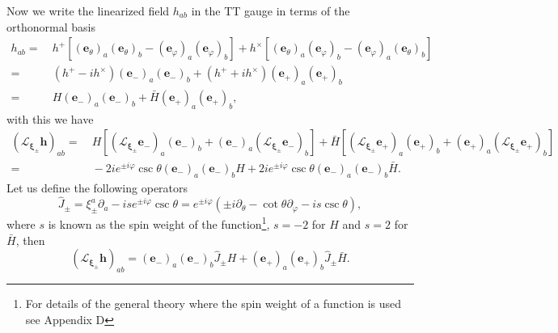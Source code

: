 Now we write the linearized field $h_{ab}$ in the TT gauge in terms
of the orthonormal basis
\begin{align*}
h_{ab}= & \ h^{+}\left[\left(\boldsymbol{e}_{\theta}\right)_{a}\left(\boldsymbol{e}_{\theta}\right)_{b}-\left(\boldsymbol{e}_{\varphi}\right)_{a}\left(\boldsymbol{e}_{\varphi}\right)_{b}\right]+h^{\times}\left[\left(\boldsymbol{e}_{\theta}\right)_{a}\left(\boldsymbol{e}_{\varphi}\right)_{b}-\left(\boldsymbol{e}_{\varphi}\right)_{a}\left(\boldsymbol{e}_{\theta}\right)_{b}\right]\\
= & \ \left(h^{+}-ih^{\times}\right)\left(\boldsymbol{e}_{-}\right)_{a}\left(\boldsymbol{e}_{-}\right)_{b}+\left(h^{+}+ih^{\times}\right)\left(\boldsymbol{e}_{+}\right)_{a}\left(\boldsymbol{e}_{+}\right)_{b}\\
= & \ H\left(\boldsymbol{e}_{-}\right)_{a}\left(\boldsymbol{e}_{-}\right)_{b}+\bar{H}\left(\boldsymbol{e}_{+}\right)_{a}\left(\boldsymbol{e}_{+}\right)_{b},
\end{align*}
with this we have
\begin{align*}
\left(\mathcal{L}_{\boldsymbol{\xi}_{\pm}}\boldsymbol{h}\right)_{ab}= & \ H\left[\left(\mathcal{L}_{\boldsymbol{\xi}_{\pm}}\boldsymbol{e}_{-}\right)_{a}\left(\boldsymbol{e}_{-}\right)_{b}+\left(\boldsymbol{e}_{-}\right)_{a}\left(\mathcal{L}_{\boldsymbol{\xi}_{\pm}}\boldsymbol{e}_{-}\right)_{b}\right]+\bar{H}\left[\left(\mathcal{L}_{\boldsymbol{\xi}_{\pm}}\boldsymbol{e}_{+}\right)_{a}\left(\boldsymbol{e}_{+}\right)_{b}+\left(\boldsymbol{e}_{+}\right)_{a}\left(\mathcal{L}_{\boldsymbol{\xi}_{\pm}}\boldsymbol{e}_{+}\right)_{b}\right]\\
= & \ -2ie^{\pm i\varphi}\csc\theta\left(\boldsymbol{e}_{-}\right)_{a}\left(\boldsymbol{e}_{-}\right)_{b}H+2ie^{\pm i\varphi}\csc\theta\left(\boldsymbol{e}_{-}\right)_{a}\left(\boldsymbol{e}_{-}\right)_{b}\bar{H}.
\end{align*}
Let us define the following operators
\[
\hat{J}_{\pm}=\xi_{\pm}^{a}\partial_{a}-ise^{\pm i\varphi}\csc\theta=e^{\pm i\varphi}\left(\pm i\partial_{\theta}-\cot\theta\partial_{\varphi}-is\csc\theta\right),
\]
where $s$ is known as the spin weight of the function\footnote{For details of the general theory where the spin weight of a function
is used see \cite{Alcubierre} Appendix D}, $s=-2$ for $H$ and $s=2$ for $\bar{H}$, then
\[
\left(\mathcal{L}_{\boldsymbol{\xi}_{\pm}}\boldsymbol{h}\right)_{ab}=\left(\boldsymbol{e}_{-}\right)_{a}\left(\boldsymbol{e}_{-}\right)_{b}\hat{J}_{\pm}H+\left(\boldsymbol{e}_{+}\right)_{a}\left(\boldsymbol{e}_{+}\right)_{b}\hat{J}_{\pm}\bar{H}.
\]
